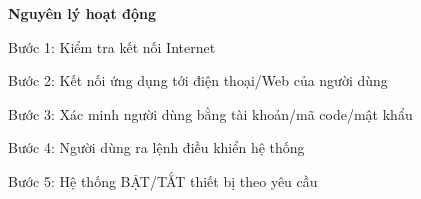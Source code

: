 \documentclass[11pt]{beamer}
\begin{document}

\begin{frame}[c]{}
		
	\begin{columns}
		\begin{column}{0.55\textwidth}

			\textbf{Nguyên lý hoạt động}

			\vspace{1em}

			Bước 1: Kiểm tra kết nối Internet

			\vspace{0.5em}

			Bước 2: Kết nối ứng dụng tới điện thoại/Web của người dùng

			\vspace{0.5em}

			Bước 3: Xác minh người dùng bằng tài khoản/mã code/mật khẩu

			\vspace{0.5em}

			Bước 4: Người dùng ra lệnh điều khiển hệ thống

			\vspace{0.5em}

			Bước 5: Hệ thống BẬT/TẮT thiết bị theo yêu cầu
			

		\end{column}


\end{columns}
\end{frame}
\end{document}
